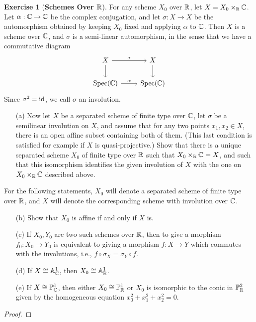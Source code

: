 \documentclass[11pt]{book}
\theoremstyle{definition}
\newtheorem{exercise}{Exercise}[section]
\begin{document}
\begin{exercise}[\textbf{Schemes Over $\mathbb{R}$}]
For any scheme $X_0$ over $\mathbb{R}$, let $X=X_0\times_{\mathbb{R}}\mathbb{C}$. Let $\alpha:\mathbb{C}\to\mathbb{C}$ be the complex conjugation, and let $\sigma:X\to X$ be the automorphism obtained by keeping $X_0$ fixed and applying $\alpha$ to $\mathbb{C}$. Then $X$ is a scheme over $\mathbb{C}$, and $\sigma$ is a semi-linear automorphism, in the sense that we have a commutative diagram
\[\begin{tikzcd}
X\ar[d]\ar[r,"\sigma"]&X\ar[d]\\
\Spec(\C)\ar[r,"\alpha"]&\Spec(\C)
\end{tikzcd}\]
Since $\sigma^2=\mathrm{id}$, we call $\sigma$ an involution.
\begin{itemize}
\item[(a)] Now let $X$ be a separated scheme of finite type over $\mathbb{C}$, let $\sigma$ be a semilinear involution on $X$, and assume that for any two points $x_1,x_2\in X$, there is an open affine subset containing both of them. (This last condition is satisfied for example if $X$ is quasi-projective.) Show that there is a unique separated scheme $X_0$ of finite type over $\mathbb{R}$ such that $X_0\times_{\mathbb{R}}\mathbb{C}=X$, and such that this isomorphism identifies the given involution of $X$ with the one on $X_0\times_{\mathbb{R}}\mathbb{C}$ described above.
\end{itemize}
For the following statements, $X_0$ will denote a separated scheme of finite type over $\mathbb{R}$, and $X$ will denote the corresponding scheme with involution over $\mathbb{C}$.
\begin{itemize}
\item[(b)] Show that $X_0$ is affine if and only if $X$ is.
\item[(c)] If $X_0,Y_0$ are two such schemes over $\mathbb{R}$, then to give a morphism $f_0:X_0\to Y_0$ is equivalent to giving a morphism $f:X\to Y$ which commutes with the involutions, i.e., $f\circ\sigma_X=\sigma_Y\circ f$.
\item[(d)] If $X\cong\mathbb{A}_{\mathbb{C}}^1$, then $X_0\cong\mathbb{A}_{\mathbb{R}}^1$.
\item[(e)] If $X\cong\mathbb{P}_{\mathbb{C}}^1$, then either $X_0\cong\mathbb{P}_{\mathbb{R}}^1$ or $X_0$ is isomorphic to the conic in $\mathbb{P}_{\mathbb{R}}^2$ given by the homogeneous equation $x_0^2+x_1^2+x_2^2=0$.
\end{itemize}
\end{exercise}
\begin{proof}

\end{proof}
\end{document}
